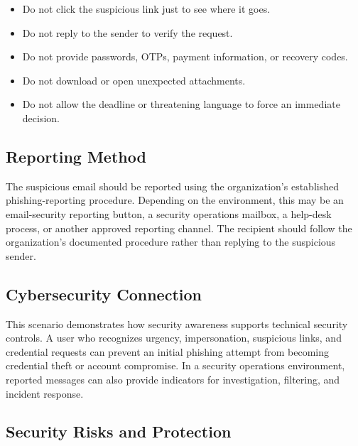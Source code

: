 \documentclass[12pt,a4paper]{article}
\begin{document}
\begin{itemize}
    \item Do not click the suspicious link just to see where it goes.
    \item Do not reply to the sender to verify the request.
    \item Do not provide passwords, OTPs, payment information, or recovery codes.
    \item Do not download or open unexpected attachments.
    \item Do not allow the deadline or threatening language to force an immediate decision.
\end{itemize}

\subsection{Reporting Method}

The suspicious email should be reported using the organization's established phishing-reporting procedure. Depending on the environment, this may be an email-security reporting button, a security operations mailbox, a help-desk process, or another approved reporting channel. The recipient should follow the organization's documented procedure rather than replying to the suspicious sender.

\subsection{Cybersecurity Connection}

This scenario demonstrates how security awareness supports technical security controls. A user who recognizes urgency, impersonation, suspicious links, and credential requests can prevent an initial phishing attempt from becoming credential theft or account compromise. In a security operations environment, reported messages can also provide indicators for investigation, filtering, and incident response.

\subsection{Security Risks and Protection}
\end{document}
